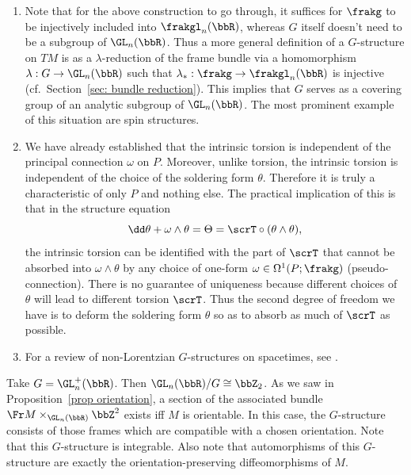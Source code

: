 \begin{rem}
    \begin{enumerate}
        \item Note that for the above construction to go through, it suffices for $\frakg$ to be injectively included into $\frakgl_n(\bbR)$, whereas $G$ itself doesn't need to be a subgroup of $\GL_n(\bbR)$. Thus a more general definition of a $G$-structure on $TM$ is as a $\lambda$-reduction of the frame bundle via a homomorphism $\lambda:G\to \GL_n(\bbR)$ such that $\lambda_\ast:\frakg\to \frakgl_n(\bbR)$ is injective (cf.\ Section~\ref{sec: bundle reduction}). This implies that $G$ serves as a covering group of an analytic subgroup of $\GL_n(\bbR)$. The most prominent example of this situation are spin structures.
        \item We have already established that the intrinsic torsion is independent of the principal connection $\omega$ on $P$. Moreover, unlike torsion, the intrinsic torsion is independent of the choice of the soldering form $\theta$. Therefore it is truly a characteristic of only $P$ and nothing else. The practical implication of this is that in the structure equation 
        \[\dd \theta+\omega\wedge\theta=\Theta=\scrT\circ (\theta\wedge\theta),\]
        the intrinsic torsion can be identified with the part of $\scrT$ that cannot be absorbed into $\omega\wedge\theta$ by any choice of one-form $\omega\in\Omega^1(P;\frakg)$ (pseudo-connection). There is no guarantee of uniqueness because different choices of $\theta$ will lead to different torsion $\scrT$. Thus the second degree of freedom we have is to deform the soldering form $\theta$ so as to absorb as much of $\scrT$ as possible. 
        \item For a review of non-Lorentzian $G$-structures on spacetimes, see \cite{OFarrill}.
    \end{enumerate}
\end{rem}


\begin{example}[Orientation]
    Take $G=\GL_n^+(\bbR)$. Then $\GL_n(\bbR)\slash G\cong \bbZ_2$. As we saw in Proposition~\ref{prop orientation}, a section of the associated bundle $\Fr M\times_{\GL_n(\bbR)}\bbZ^2$ exists iff $M$ is orientable. In this case, the $G$-structure consists of those frames which are compatible with a chosen orientation. Note that this $G$-structure is integrable. Also note that automorphisms of this $G$-structure are exactly the orientation-preserving diffeomorphisms of $M$.
\end{example}

